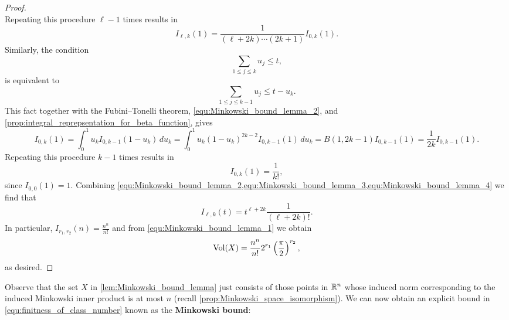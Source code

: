 \begin{proof}
\[      \]
      Repeating this procedure $\ell-1$ times results in
      \begin{equation}\label{equ:Minkowski_bound_lemma_3}
        I_{\ell,k}(1) = \frac{1}{(\ell+2k) \cdots (2k+1)}I_{0,k}(1).
      \end{equation}
      Similarly, the condition
      \[
        \sum_{1 \le j \le k}u_{j} \le t,
      \]
      is equivalent to
      \[
        \sum_{1 \le j \le k-1}u_{j} \le t-u_{k}.
      \]
      This fact together with the Fubini–Tonelli theorem, \cref{equ:Minkowski_bound_lemma_2}, and \cref{prop:integral_reprepsentation_for_beta_function}, gives
      \[
        I_{0,k}(1) = \int_{0}^{1}u_{k}I_{0,k-1}(1-u_{k})\,du_{k} = \int_{0}^{1}u_{k}(1-u_{k})^{2k-2}I_{0,k-1}(1)\,du_{k} = B(1,2k-1)I_{0,k-1}(1) = \frac{1}{2k}I_{0,k-1}(1).
      \]
      Repeating this procedure $k-1$ times results in
      \begin{equation}\label{equ:Minkowski_bound_lemma_4}
        I_{0,k}(1) = \frac{1}{k!},
      \end{equation}
      since $I_{0,0}(1) = 1$. Combining \cref{equ:Minkowski_bound_lemma_2,equ:Minkowski_bound_lemma_3,equ:Minkowski_bound_lemma_4} we find that
      \[
        I_{\ell,k}(t) = t^{\ell+2k}\frac{1}{(\ell+2k)!}.
      \]
      In particular, $I_{r_{1},r_{2}}(n) = \frac{n^{n}}{n!}$ and from \cref{equ:Minkowski_bound_lemma_1} we obtain
      \[
        \operatorname{\mathrm{Vol}}(X) = \frac{n^{n}}{n!}2^{r_{1}}\left(\frac{\pi}{2}\right)^{r_{2}},
      \]
      as desired.
    \end{proof}

    Observe that the set $X$ in \cref{lem:Minkowski_bound_lemma} just consists of those points in $\mathbb{R}^{n}$ whose induced norm corresponding to the induced Minkowski inner product is at most $n$ (recall \cref{prop:Minkowski_space_isomorphism}). We can now obtain an explicit bound in \cref{equ:finitness_of_class_number} known as the \textbf{Minkowski bound}:


